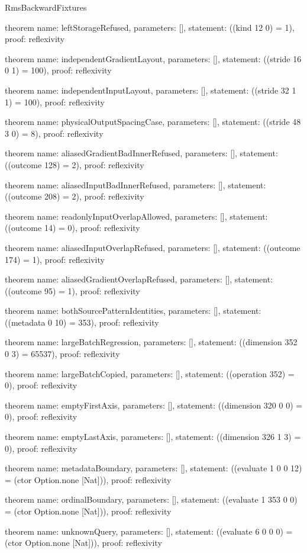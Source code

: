 \begin{lexlean}{RmsBackwardFixtures}
\begin{semanticmodule}
theorem{
  name: leftStorageRefused,
  parameters: [],
  statement: ((kind 12 0) = 1),
  proof: reflexivity{}
}

theorem{
  name: independentGradientLayout,
  parameters: [],
  statement: ((stride 16 0 1) = 100),
  proof: reflexivity{}
}

theorem{
  name: independentInputLayout,
  parameters: [],
  statement: ((stride 32 1 1) = 100),
  proof: reflexivity{}
}

theorem{
  name: physicalOutputSpacingCase,
  parameters: [],
  statement: ((stride 48 3 0) = 8),
  proof: reflexivity{}
}

theorem{
  name: aliasedGradientBadInnerRefused,
  parameters: [],
  statement: ((outcome 128) = 2),
  proof: reflexivity{}
}

theorem{
  name: aliasedInputBadInnerRefused,
  parameters: [],
  statement: ((outcome 208) = 2),
  proof: reflexivity{}
}

theorem{
  name: readonlyInputOverlapAllowed,
  parameters: [],
  statement: ((outcome 14) = 0),
  proof: reflexivity{}
}

theorem{
  name: aliasedInputOverlapRefused,
  parameters: [],
  statement: ((outcome 174) = 1),
  proof: reflexivity{}
}

theorem{
  name: aliasedGradientOverlapRefused,
  parameters: [],
  statement: ((outcome 95) = 1),
  proof: reflexivity{}
}

theorem{
  name: bothSourcePatternIdentities,
  parameters: [],
  statement: ((metadata 0 10) = 353),
  proof: reflexivity{}
}

theorem{
  name: largeBatchRegression,
  parameters: [],
  statement: ((dimension 352 0 3) = 65537),
  proof: reflexivity{}
}

theorem{
  name: largeBatchCopied,
  parameters: [],
  statement: ((operation 352) = 0),
  proof: reflexivity{}
}

theorem{
  name: emptyFirstAxis,
  parameters: [],
  statement: ((dimension 320 0 0) = 0),
  proof: reflexivity{}
}

theorem{
  name: emptyLastAxis,
  parameters: [],
  statement: ((dimension 326 1 3) = 0),
  proof: reflexivity{}
}

theorem{
  name: metadataBoundary,
  parameters: [],
  statement: ((evaluate 1 0 0 12) = (ctor Option.none [Nat])),
  proof: reflexivity{}
}

theorem{
  name: ordinalBoundary,
  parameters: [],
  statement: ((evaluate 1 353 0 0) = (ctor Option.none [Nat])),
  proof: reflexivity{}
}

theorem{
  name: unknownQuery,
  parameters: [],
  statement: ((evaluate 6 0 0 0) = (ctor Option.none [Nat])),
  proof: reflexivity{}
}
\end{semanticmodule}
\end{lexlean}
